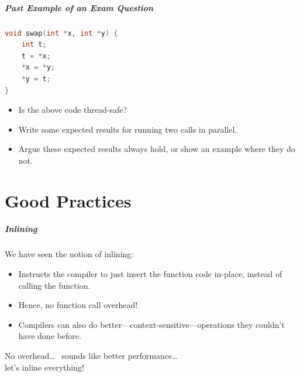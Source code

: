 \begin{frame}[fragile]
  \frametitle{Past Example of an Exam Question}

  

  \begin{lstlisting}[language=C]
void swap(int *x, int *y) {
    int t;
    t = *x;
    *x = *y;
    *y = t;
}  
  \end{lstlisting}
  \vfill
  \begin{itemize}
    \item Is the above code thread-safe?
    \vfill
    \item Write some expected results for running two calls in parallel.
    \vfill
    \item Argue these expected results always hold, or show an example where
      they do not.
  \end{itemize}
  
\end{frame}

\part{Good Practices}
\frame{\partpage}

\begin{frame}
  \frametitle{Inlining}

  

  We have seen the notion of inlining:
  \begin{itemize}
    \item Instructs the compiler to just insert the function code in-place,
      instead of calling the function.
    \item Hence, no function call overhead!
    \item Compilers can also do better---context-sensitive---operations they couldn't
      have done before.
  \end{itemize}
  \vfill
  No overhead\ldots~ sounds like better performance\ldots~ \\let's inline everything!
  
\end{frame}

